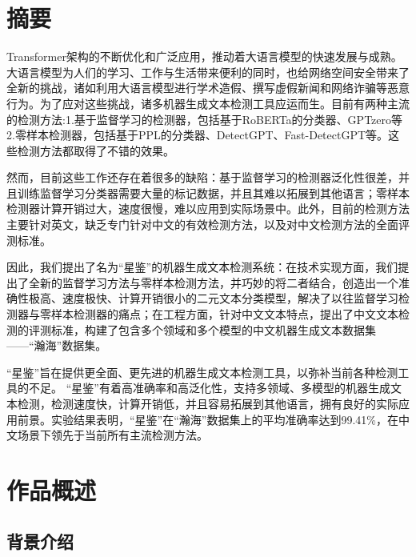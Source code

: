 \documentclass[a4paper]{report}
\begin{document}
\tableofcontents

\chapter*{摘要}
Transformer架构的不断优化和广泛应用，推动着大语言模型的快速发展与成熟。大语言模型为人们的学习、工作与生活带来便利的同时，也给网络空间安全带来了全新的挑战，诸如利用大语言模型进行学术造假、撰写虚假新闻和网络诈骗等恶意行为。为了应对这些挑战，诸多机器生成文本检测工具应运而生。目前有两种主流的检测方法:1.基于监督学习的检测器，包括基于RoBERTa的分类器、GPTzero等 2.零样本检测器，包括基于PPL的分类器、DetectGPT、Fast-DetectGPT等。这些检测方法都取得了不错的效果。

然而，目前这些工作还存在着很多的缺陷：基于监督学习的检测器泛化性很差，并且训练监督学习分类器需要大量的标记数据，并且其难以拓展到其他语言；零样本检测器计算开销过大，速度很慢，难以应用到实际场景中。此外，目前的检测方法主要针对英文，缺乏专门针对中文的有效检测方法，以及对中文检测方法的全面评测标准。

因此，我们提出了名为“星鉴”的机器生成文本检测系统：在技术实现方面，我们提出了全新的监督学习方法与零样本检测方法，并巧妙的将二者结合，创造出一个准确性极高、速度极快、计算开销很小的二元文本分类模型，解决了以往监督学习检测器与零样本检测器的痛点；在工程方面，针对中文文本特点，提出了中文文本检测的评测标准，构建了包含多个领域和多个模型的中文机器生成文本数据集——“瀚海”数据集。

“星鉴”旨在提供更全面、更先进的机器生成文本检测工具，以弥补当前各种检测工具的不足。 “星鉴”有着高准确率和高泛化性，支持多领域、多模型的机器生成文本检测，检测速度快，计算开销低，并且容易拓展到其他语言，拥有良好的实际应用前景。实验结果表明，“星鉴”在“瀚海”数据集上的平均准确率达到99.41\%，在中文场景下领先于当前所有主流检测方法。



\chapter{作品概述}
\section{背景介绍}
\end{document}
